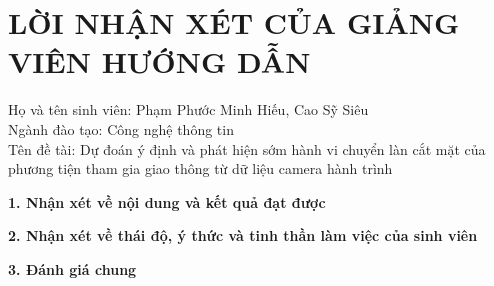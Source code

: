 \newpage
\thispagestyle{empty}

\section*{LỜI NHẬN XÉT CỦA GIẢNG VIÊN HƯỚNG DẪN}

\vspace{0.3cm}

\noindent
Họ và tên sinh viên: Phạm Phước Minh Hiếu, Cao Sỹ Siêu\\
Ngành đào tạo: Công nghệ thông tin\\
Tên đề tài: Dự đoán ý định và phát hiện sớm hành vi chuyển làn cắt mặt của phương tiện tham gia giao thông từ dữ liệu camera hành trình

\vspace{0.5cm}

\noindent
\textbf{1. Nhận xét về nội dung và kết quả đạt được}

\vspace{0.15cm}
\noindent\dotfill\par
\noindent\dotfill\par
\noindent\dotfill\par
\noindent\dotfill\par
\noindent\dotfill\par
\noindent\dotfill

\vspace{0.45cm}

\noindent
\textbf{2. Nhận xét về thái độ, ý thức và tinh thần làm việc của sinh viên}

\vspace{0.15cm}
\noindent\dotfill\par
\noindent\dotfill\par
\noindent\dotfill\par
\noindent\dotfill\par
\noindent\dotfill\par
\noindent\dotfill

\vspace{0.45cm}

\noindent
\textbf{3. Đánh giá chung}

\vspace{0.15cm}
\noindent\dotfill\par
\noindent\dotfill\par
\noindent\dotfill\par
\noindent\dotfill\par
\noindent\dotfill\par
\noindent\dotfill

